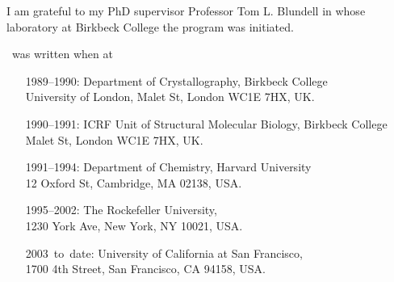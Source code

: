 


\noindent I am grateful to my PhD supervisor Professor Tom L.  Blundell in 
whose laboratory at Birkbeck College the program was initiated.

\vspace{2cm}

\noindent \MDT\ was written when at

\vspace{0.8cm}

\begin{latexonly}
\hspace{1cm} \parbox{15cm}{
\noindent \begin{itemize}
\item[\mbox{1989--1990:}] Department of Crystallography, Birkbeck College \\
                    University of London, Malet St, 
                    London WC1E 7HX, UK. \\

\item[\mbox{1990--1991:}] ICRF Unit of Structural Molecular Biology, 
                    Birkbeck College \\
                    Malet St, London WC1E 7HX, UK. \\

\item[\mbox{1991--1994:}] Department of Chemistry, Harvard University \\
                    12 Oxford St, Cambridge, MA 02138, USA. \\

\item[\mbox{1995--2002:}] The Rockefeller University, \\
                    1230 York Ave, New York, NY 10021, USA. \\

\item[\mbox{2003 to date:}] University of California at San Francisco, \\
                    1700 4th Street, San Francisco, CA 94158, USA. \\
\end{itemize}
}

\end{latexonly}
